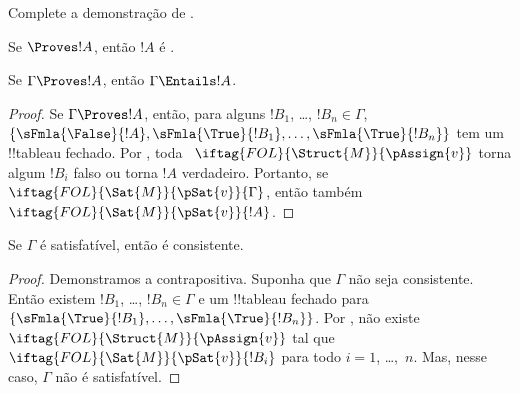\documentclass[../../../include/open-logic-section]{subfiles}
\begin{document}
\begin{prob}
Complete a demonstração de .
\end{prob}
\tagendprob

\begin{cor}
Se $\Proves !A$, então $!A$ é .
\end{cor}

\begin{cor}
Se $\Gamma \Proves !A$, então $\Gamma \Entails !A$.
\end{cor}

\begin{proof}
  Se $\Gamma \Proves !A$, então, para alguns $!B_1$, \dots, $!B_n \in
  \Gamma$, $\{\sFmla{\False}{!A}, \sFmla{\True}{!B_1}, \dots,
  \sFmla{\True}{!B_n}\}$ tem um !!{tableau} fechado. Por
  , toda
  ~$\iftag{FOL}{\Struct{M}}{\pAssign{v}}$
  torna algum $!B_i$ falso ou torna $!A$ verdadeiro. Portanto, se
  $\iftag{FOL}{\Sat{M}}{\pSat{v}}{\Gamma}$, então também
  $\iftag{FOL}{\Sat{M}}{\pSat{v}}{!A}$.
\end{proof}

\begin{cor}
Se $\Gamma$ é satisfatível, então é consistente.
\end{cor}

\begin{proof}
Demonstramos a contrapositiva. Suponha que $\Gamma$ não seja consistente.
Então existem $!B_1$, \dots, $!B_n \in \Gamma$ e um
!!{tableau} fechado para $\{\sFmla{\True}{!B_1}, \dots, \sFmla{\True}{!B_n}\}$. Por
, não existe
$\iftag{FOL}{\Struct{M}}{\pAssign{v}}$ tal que
$\iftag{FOL}{\Sat{M}}{\pSat{v}}{!B_i}$ para todo $i=1$, \dots,~$n$. Mas,
nesse caso, $\Gamma$ não é satisfatível.
\end{proof}
\end{document}
